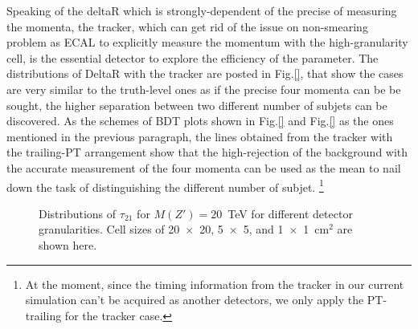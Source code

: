 Speaking of the deltaR which is strongly-dependent of the precise of measuring the momenta, the tracker, which can get rid of the issue on non-smearing problem as ECAL to explicitly measure the momentum with the high-granularity cell, is the essential detector to explore the efficiency of the parameter. The distributions of DeltaR with the tracker are posted in Fig.\ref{}, that show the cases are very similar to the truth-level ones as if the precise four momenta can be be sought, the higher separation between two different number of subjets can be discovered. As the schemes of BDT plots shown in Fig.\ref{} and Fig.\ref{} as the ones mentioned in the previous paragraph, the lines obtained from the tracker with the trailing-PT arrangement show that the high-rejection of the background with the accurate measurement of the four momenta can be used as the mean to nail down the task of distinguishing the different number of subjet. \footnote{At the moment, since the timing information from the tracker in our current simulation can't be acquired as another detectors, we only apply the PT-trailing for the tracker case.}\\

\begin{figure}
\begin{center}
\end{center}
\caption{Distributions of $\tau_{21}$ for $M(Z') = 20$~TeV for different 
detector granularities. Cell sizes of 20~$\times$~20, 5~$\times$~5, and 1~$\times$~1~cm$^2$ 
are shown here. \label{fig:Rawhit_05GeV_tau21_Dis}}
\end{figure}

